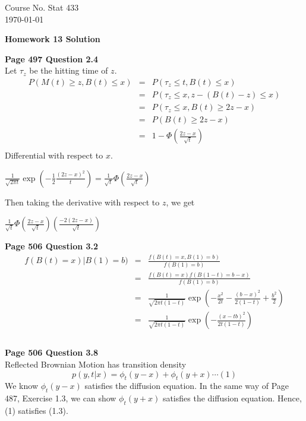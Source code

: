 \documentclass[10pt,a4paper]{article}
\begin{document}
\begin{flushleft}
Course No. Stat 433 \\
\today
\end{flushleft}

\begin{center}
{\Large{\bf  Homework 13 Solution}}
\end{center}


\begin{flushleft}
\textbf{Page 497 Question 2.4}\\
Let $\tau_z$ be the hitting time of $z$.
\begin{eqnarray*}
P(M(t) \geq z, B(t) \leq x) &=& P(\tau_z \leq t, B(t) \leq x)\\
&=& P(\tau_z \leq x, z - (B(t) - z) \leq x) \\
&=& P(\tau_z \leq x, B(t) \geq 2z - x) \\
&=& P(B(t) \geq 2z - x) \\
&=& 1 - \Phi(\frac{2z-x}{\sqrt{t}})\\
\end{eqnarray*}
Differential with respect to $x$. \\
\begin{center}
$\frac{1}{\sqrt{2\pi t}}\exp(-\frac{1}{2}\frac{(2z-x)^2}{t}) =
\frac{1}{\sqrt{t}}\Phi(\frac{2z-x}{\sqrt{t}})$\end{center}

Then taking the derivative with respect to $z$, we get
\begin{center}
$\frac{1}{\sqrt{t}}\Phi(\frac{2z-x}{\sqrt{t}})(\frac{-2(2z-x)}{\sqrt{t}})$
\end{center}



\textbf{Page 506 Question 3.2}\\

\begin{eqnarray*}
f(B(t)=x)|B(1)=b) & = & \frac{f(B(t)=x,B(1)=b)}{f(B(1)=b)} \\
& = & \frac{f(B(t)=x)f(B(1-t)=b-x)}{f(B(1)=b)} \\
& = &
\frac{1}{\sqrt{2\pi t(1-t)}}\exp(-\frac{x^2}{2t}-\frac{(b-x)^2}{2(1-t)}+\frac{b^2}{2}) \\
& = & \frac{1}{\sqrt{2\pi t(1-t)}}\exp(-\frac{(x-tb)^2}{2t(1-t)})
\end{eqnarray*}
\begin{eqnarray*}
\\
\end{eqnarray*}

\textbf{Page 506 Question 3.8}\\

Reflected Brownian Motion has transition density
$$p(y,t|x)=\phi_{t}(y-x)+\phi_{t}(y+x) \cdots (1)$$
We know $\phi_{t}(y-x)$ satisfies the diffusion equation. In the
same way of Page 487, Exercise 1.3, we can show $\phi_{t}(y+x)$
satisfies the diffusion equation. Hence, (1) satisfies (1.3).

\begin{eqnarray*}
\\
\end{eqnarray*}



\end{flushleft}
\end{document}
